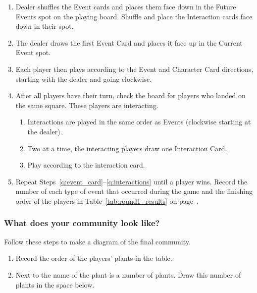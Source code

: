 \documentclass[12pt, hidelinks]{exam}
\begin{document}
\begin{questions}
\begin{enumerate}
	\item Dealer shuffles the Event cards and places them face down in the 
	Future Events spot on the playing board. Shuffle and place the 
	Interaction cards face down in their spot.
	
	\item \label{q:event_card} The dealer draws the first Event Card and places it face 
	up in the Current Event spot.
	
	\item Each player then plays according to the Event and Character 
	Card directions, starting with the dealer and going clockwise.
	
	\item \label{q:interactions} After all players have their turn, check the board for 
	players who landed on the same square. These players are interacting.
	
	\begin{enumerate}[label=(\alph*)]
		\item Interactions are played in the same order as Events (clockwise starting at the dealer).

		\item Two at a time, the interacting players draw one Interaction Card.
		
		\item Play according to the interaction card.
	\end{enumerate}

	\filbreak

	\item Repeat Steps~\ref{q:event_card}–\ref{q:interactions} until a player wins. 
	Record the number of each type of event that occurred during the game and the finishing order of the players in Table~\ref{tab:round1_results} on page~\pageref{tab:round1_results}.
	
	
\end{enumerate}

\subsubsection*{What does your community look like?}

Follow these steps to make a diagram of the final community.

\begin{enumerate}[resume]
	\item Record the order of the players’ plants in the table.
	
	\item Next to the name of the plant is a number of plants. 
	Draw this number of plants in the space below.
	

\end{enumerate}
\end{questions}
\end{document}
